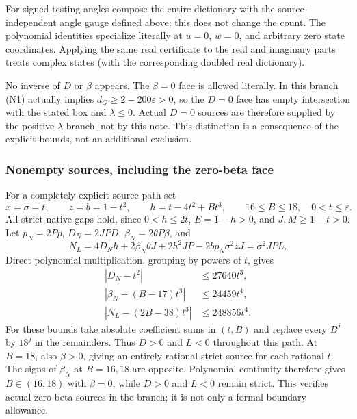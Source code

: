 \documentclass[11pt]{article}
\newcommand{\eps}{\varepsilon}
\begin{document}
For signed testing angles compose the entire dictionary with the
source-independent angle gauge defined above; this does
not change the count. The polynomial identities specialize literally
at $u=0$, $w=0$, and arbitrary zero state coordinates. Applying
the same real certificate to the real and imaginary parts treats
complex states (with the corresponding doubled real dictionary).

No inverse of $D$ or $\beta$ appears. The $\beta=0$ face is allowed
literally. In this branch (N1) actually implies
$d_G\ge2-200\eps>0$, so the $D=0$ face has empty intersection
with the stated box and $\lambda\le0$. Actual $D=0$ sources are
therefore supplied by the positive-$\lambda$ branch, not by this note.
This distinction is a consequence of the explicit bounds, not an
additional exclusion.

\subsubsection*{Nonempty sources, including the zero-beta face}
For a completely explicit source path set
\[
 x=\sigma=t,\qquad z=b=1-t^2,\qquad
 h=t-4t^2+Bt^3,\qquad 16\le B\le18,\quad0<t\le\eps.
\]
All strict native gaps hold, since $0<h\le2t$, $E=1-h>0$,
and $J,M\ge1-t>0$. Let $p_N=2Pp$, $D_N=2JPD$,
$\beta_N=2\theta P\beta$, and
\[
 N_L=4D_Nh+2\beta_N\theta J+2h^2JP
                              -2bp_N\sigma^2zJ=\sigma^2JP L.
\]
Direct polynomial multiplication, grouping by powers of $t$, gives
\[
\begin{split}
 |D_N-t^2|&\le27640t^3,\\
 |\beta_N-(B-17)t^3|&\le24459t^4,\\
 |N_L-(2B-38)t^3|&\le248856t^4.
\end{split}
\]
For these bounds take absolute coefficient sums in $(t,B)$ and
replace every $B^j$ by $18^j$ in the remainders. Thus $D>0$ and
$L<0$ throughout this path. At $B=18$, also $\beta>0$, giving
an entirely rational strict source for each rational $t$.
The signs of $\beta_N$ at $B=16,18$ are opposite. Polynomial
continuity therefore gives $B\in(16,18)$ with $\beta=0$, while
$D>0$ and $L<0$ remain strict. This verifies actual zero-beta
sources in the branch; it is not only a formal boundary allowance.
\end{document}
